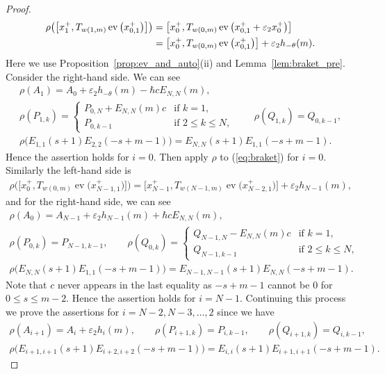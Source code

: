 \documentclass[pdftex]{sigma}
\theoremstyle{definition}
\numberwithin{equation}{section}
\DeclareMathOperator{\ev}{ev}
\newcommand{\ve}{\varepsilon}
\begin{document}
\begin{proof}
\begin{gather*}
\begin{split}&
 \rho\big(\big[x_1^+, T_{w(1,m)} \ev\big(x_{0,1}^+\big)\big]\big)=\big[x_0^+, T_{w(0,m)} \ev\big(x_{0,1}^++\ve_2 x_0^+\big)\big]\\
& \hphantom{\rho\big(\big[x_1^+, T_{w(1,m)} \ev\big(x_{0,1}^+\big)\big]\big)}{} = \big[x_0^+, T_{w(0,m)} \ev\big(x_{0,1}^+\big)\big] + \ve_2 h_{-\theta}(m).
\end{split}
\end{gather*}
Here we use Proposition~\ref{prop:ev_and_auto}(ii) and Lemma~\ref{lem:braket_pre}. Consider the right-hand side. We can see
\begin{gather*}
\rho(A_1) = A_0 + \ve_2 h_{-\theta}(m) - \hbar c E_{N,N}(m),\\
\rho(P_{1,k}) = \begin{cases}
P_{0,N} + E_{N,N}(m)c & \text{if $k=1$},\\
P_{0,k-1} & \text{if $2 \leq k \leq N$},
\end{cases}\qquad
\rho(Q_{1,k}) = Q_{0,k-1},\\
\rho\big(E_{1,1}(s+1)E_{2,2}(-s+m-1)\big) = E_{N,N}(s+1)E_{1,1}(-s+m-1).
\end{gather*}
Hence the assertion holds for $i=0$. Then apply $\rho$ to (\ref{eq:braket}) for $i=0$. Similarly the left-hand side is
\begin{gather*}
 \rho\big(\big[x_0^+, T_{w(0,m)} \ev\big(x_{N-1,1}^+\big)\big]\big)= \big[x_{N-1}^+, T_{w(N-1,m)} \ev\big(x_{N-2,1}^+\big)\big] + \ve_2 h_{N-1}(m),
\end{gather*}
and for the right-hand side, we can see
\begin{gather*}
\rho(A_0) = A_{N-1} + \ve_2 h_{N-1}(m) + \hbar c E_{N,N}(m),\\
\rho(P_{0,k}) = P_{N-1,k-1}, \qquad \rho(Q_{0,k}) = \begin{cases}
Q_{N-1,N} - E_{N,N}(m)c & \text{if $k=1$},\\
Q_{N-1,k-1} & \text{if $2 \leq k \leq N$},
\end{cases}\\
\rho\big(E_{N,N}(s+1)E_{1,1}(-s+m-1)\big) = E_{N-1,N-1}(s+1)E_{N,N}(-s+m-1).
\end{gather*}
Note that $c$ never appears in the last equality as $-s+m-1$ cannot be $0$ for $0 \leq s \leq m-2$. Hence the assertion holds for $i=N-1$. Continuing this process we prove the assertions for $i=N-2, N-3,\ldots,2$ since we have
\begin{gather*}
\rho(A_{i+1}) = A_{i} + \ve_2 h_{i}(m),\qquad \rho(P_{i+1,k}) = P_{i,k-1}, \qquad \rho(Q_{i+1,k}) =Q_{i,k-1},\\
\rho\big(E_{i+1,i+1}(s+1)E_{i+2,i+2}(-s+m-1)\big) = E_{i,i}(s+1)E_{i+1,i+1}(-s+m-1).\tag*{\qed}
\end{gather*}\renewcommand{\qed}{}
\end{proof}
\end{document}
